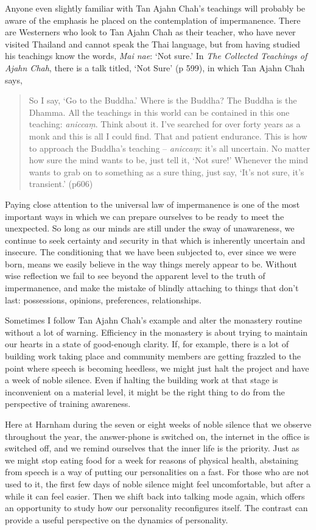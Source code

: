 Anyone even slightly familiar with Tan Ajahn Chah's teachings will
probably be aware of the emphasis he placed on the contemplation of
impermanence. There are Westerners who look to Tan Ajahn Chah as their
teacher, who have never visited Thailand and cannot speak the Thai
language, but from having studied his teachings know the words,
\emph{Mai nae}: `Not sure.' In \emph{The Collected Teachings of Ajahn Chah}\cite{collected},
there is a talk titled, `Not Sure' (p 599), in which Tan Ajahn Chah says,

\begin{quotation}
So I say, `Go to the Buddha.' Where is the Buddha? The Buddha is the
Dhamma. All the teachings in this world can be contained in this one
teaching: \emph{aniccaṃ}. Think about it. I've searched for over forty
years as a monk and this is all I could find. That and patient
endurance. This is how to approach the Buddha's teaching --
\emph{aniccaṃ}: it's all uncertain. No matter how sure the mind wants to
be, just tell it, `Not sure!' Whenever the mind wants to grab on to
something as a sure thing, just say, `It's not sure, it's transient.'
(p606)
\end{quotation}

Paying close attention to the universal law of impermanence is one of
the most important ways in which we can prepare ourselves to be ready to
meet the unexpected. So long as our minds are still under the sway of
unawareness, we continue to seek certainty and security in that which is
inherently uncertain and insecure. The conditioning that we have been
subjected to, ever since we were born, means we easily believe in the
way things merely appear to be. Without wise reflection we fail to see
beyond the apparent level to the truth of impermanence, and make the
mistake of blindly attaching to things that don't last: possessions,
opinions, preferences, relationships.

Sometimes I follow Tan Ajahn Chah's example and alter the monastery
routine without a lot of warning. Efficiency in the monastery is about
trying to maintain our hearts in a state of good-enough clarity. If, for
example, there is a lot of building work taking place and community
members are getting frazzled to the point where speech is becoming
heedless, we might just halt the project and have a week of noble
silence. Even if halting the building work at that stage is inconvenient
on a material level, it might be the right thing to do from the
perspective of training awareness.

Here at Harnham during the seven or eight weeks of noble silence that we
observe throughout the year, the answer-phone is switched on, the
internet in the office is switched off, and we remind ourselves that the
inner life is the priority. Just as we might stop eating food for a week
for reasons of physical health, abstaining from speech is a way of
putting our personalities on a fast. For those who are not used to it,
the first few days of noble silence might feel uncomfortable, but after
a while it can feel easier. Then we shift back into talking mode
again, which offers an opportunity to study how our personality
reconfigures itself. The contrast can provide a useful perspective on
the dynamics of personality.

